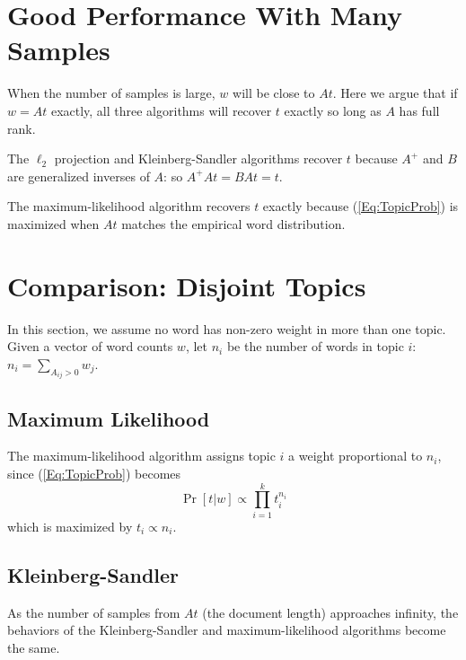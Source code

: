 \documentclass{article}
\begin{document}
\section{Good Performance With Many Samples}
\label{Sec:ManySamplesGoodPerformance}

When the number of samples is large, \(w\) will be close to \(A t\).
Here we argue that if \(w = A t\) exactly, all three algorithms will recover \(t\) exactly so long as \(A\) has full rank.

The \(\ell_2\) projection and Kleinberg-Sandler algorithms recover \(t\) because \(A^+\) and \(B\) are generalized inverses of \(A\): so \(A^+ A t = B A t = t\).

The maximum-likelihood algorithm recovers \(t\) exactly because (\ref{Eq:TopicProb}) is maximized when \(A t\) matches the empirical word distribution.

\section{Comparison: Disjoint Topics}

In this section, we assume no word has non-zero weight in more than one topic.
Given a vector of word counts \(w\), let \(n_i\) be the number of words in topic \(i\): \(n_i = \sum_{A_{ij} > 0} w_j\).

\subsection{Maximum Likelihood}

The maximum-likelihood algorithm assigns topic \(i\) a weight proportional to \(n_i\), since (\ref{Eq:TopicProb}) becomes
\[ \Pr[t | w] \propto \prod_{i=1}^k t_i^{n_i} \]
which is maximized by \(t_i \propto n_i\).

\subsection{Kleinberg-Sandler}
\label{Sec:KSDisjoint}

As the number of samples from \(A t\) (the document length) approaches infinity, the behaviors of the Kleinberg-Sandler and maximum-likelihood algorithms become the same.
\end{document}
